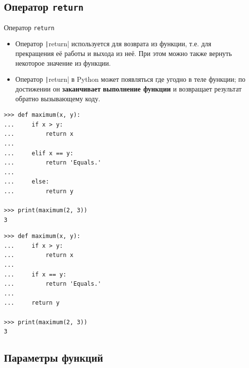 \documentclass[aspectratio=169]{beamer}%
\begin{document}
\subsection{Оператор \texttt{return}}

\begin{frame}[fragile]{Оператор \texttt{return}}
\scriptsize
\begin{itemize}
\item Оператор \texttt|return| используется для возврата из функции, т.е. для прекращения её работы и выхода из неё. При этом можно также вернуть некоторое значение из функции.
\item Оператор \texttt|return| в Python может появляться где угодно в теле функции; по достижении он \textbf{заканчивает} \textbf{выполнение функции} и возвращает результат обратно вызывающему коду.
\end{itemize}

\begin{minipage}{.47\textwidth}
\begin{verbatim}
>>> def maximum(x, y): 
...     if x > y:
...         return x
...
...     elif x == y:
...         return 'Equals.' 
...     
...     else:
...         return y

>>> print(maximum(2, 3))
3
\end{verbatim}
\end{minipage}
\begin{minipage}{.05\textwidth}
\hspace{.1ex}
\end{minipage}
\begin{minipage}{.47\textwidth}
\begin{verbatim}
>>> def maximum(x, y): 
...     if x > y:
...         return x
...
...     if x == y:
...         return 'Equals.' 
...
...     return y

>>> print(maximum(2, 3))
3
\end{verbatim}
\vspace{.08ex}
\end{minipage}
\vfill
\end{frame}


\subsection{Параметры функций}
\end{document}

